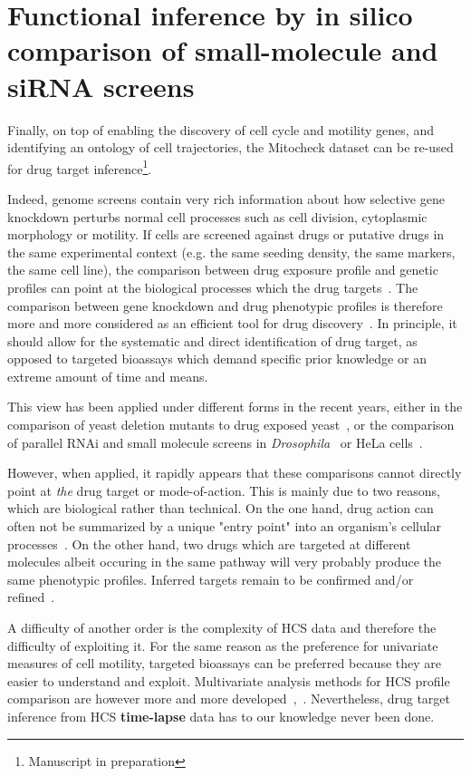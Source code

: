 \section{Functional inference by in silico comparison of small-molecule and siRNA screens}
\label{target_inference}
Finally, on top of enabling the discovery of cell cycle and motility genes, and identifying an ontology of cell trajectories, the Mitocheck dataset can be re-used for drug target inference\footnote{Manuscript in preparation}.

Indeed, genome screens contain very rich information about how selective gene knockdown perturbs normal cell processes such as cell division, cytoplasmic morphology or motility. If cells are screened against drugs or putative drugs in the same experimental context (e.g. the same seeding density, the same markers, the same cell line), the comparison between drug exposure profile and genetic profiles can point at the biological processes which the drug targets~\cite{pmid16901791}. The comparison between gene knockdown and drug phenotypic profiles is therefore more and more considered as an efficient tool for drug discovery~\cite{pmid19568283}. In principle, it should allow for the systematic and direct identification of drug target, as opposed to targeted bioassays which demand specific prior knowledge or an extreme amount of time and means.

This view has been applied under different forms in the recent years, either in the comparison of yeast deletion mutants to drug exposed yeast~\cite{pmid20418956}, or the comparison of parallel RNAi and small molecule screens in \textit{Drosophila}~\cite{pmid16901791} or HeLa cells~\cite{pmid18066055}.

However, when applied, it rapidly appears that these comparisons cannot directly point at \textit{the} drug target or mode-of-action. This is mainly due to two reasons, which are biological rather than technical. On the one hand, drug action can often not be summarized by a unique "entry point" into an organism's cellular processes~\cite{pmid26272035}. On the other hand, two drugs which are targeted at different molecules albeit occuring in the same pathway will very probably produce the same phenotypic profiles. Inferred targets remain to be confirmed and/or refined~\cite{pmid23508189}.

A difficulty of another order is the complexity of HCS data and therefore the difficulty of exploiting
it. For the same reason as the preference for univariate measures of
cell motility, targeted bioassays can be preferred because they are
easier to understand and exploit. Multivariate analysis methods for
HCS profile comparison are however more and more
developed~\cite{pmid17401369},~\cite{pmid18066055}. Nevertheless, drug
target inference from HCS \textbf{time-lapse} data has to our
knowledge never been done.

